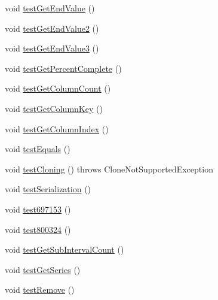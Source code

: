 \begin{DoxyCompactItemize}
void \mbox{\hyperlink{classorg_1_1jfree_1_1data_1_1gantt_1_1_task_series_collection_test_a01d561eb7a8a40abb19d4590eebda12e}{test\+Get\+End\+Value}} ()
\item 
void \mbox{\hyperlink{classorg_1_1jfree_1_1data_1_1gantt_1_1_task_series_collection_test_abdb50e6eccbf3965468acae3431eda00}{test\+Get\+End\+Value2}} ()
\item 
void \mbox{\hyperlink{classorg_1_1jfree_1_1data_1_1gantt_1_1_task_series_collection_test_a1352b5a7e56bd8aa106f960e5f23afeb}{test\+Get\+End\+Value3}} ()
\item 
void \mbox{\hyperlink{classorg_1_1jfree_1_1data_1_1gantt_1_1_task_series_collection_test_a6be0bce25b3c0331ebc6fadff7fbaed9}{test\+Get\+Percent\+Complete}} ()
\item 
void \mbox{\hyperlink{classorg_1_1jfree_1_1data_1_1gantt_1_1_task_series_collection_test_ad8b1835c0fc6e96a371275ae60d9b7be}{test\+Get\+Column\+Count}} ()
\item 
void \mbox{\hyperlink{classorg_1_1jfree_1_1data_1_1gantt_1_1_task_series_collection_test_a4e1fbbdeae868d4a8b20175efdd86a35}{test\+Get\+Column\+Key}} ()
\item 
void \mbox{\hyperlink{classorg_1_1jfree_1_1data_1_1gantt_1_1_task_series_collection_test_afa575992ee65e258f946ef72916b9bcd}{test\+Get\+Column\+Index}} ()
\item 
void \mbox{\hyperlink{classorg_1_1jfree_1_1data_1_1gantt_1_1_task_series_collection_test_adc03e27bbd273f31326b7d4a3b68d0db}{test\+Equals}} ()
\item 
void \mbox{\hyperlink{classorg_1_1jfree_1_1data_1_1gantt_1_1_task_series_collection_test_aafd84de25538bc96eb104ba5385b83a0}{test\+Cloning}} ()  throws Clone\+Not\+Supported\+Exception 
\item 
void \mbox{\hyperlink{classorg_1_1jfree_1_1data_1_1gantt_1_1_task_series_collection_test_ab56b2ba40bf9a5ae740208d1c5639a74}{test\+Serialization}} ()
\item 
void \mbox{\hyperlink{classorg_1_1jfree_1_1data_1_1gantt_1_1_task_series_collection_test_a73f3a71d4db1e6b141debe68c2f035f9}{test697153}} ()
\item 
void \mbox{\hyperlink{classorg_1_1jfree_1_1data_1_1gantt_1_1_task_series_collection_test_af8cfbc63fe59afd204f72b7463cd8c7c}{test800324}} ()
\item 
void \mbox{\hyperlink{classorg_1_1jfree_1_1data_1_1gantt_1_1_task_series_collection_test_a7ccd3ebb36a688121cdc24d702b47499}{test\+Get\+Sub\+Interval\+Count}} ()
\item 
void \mbox{\hyperlink{classorg_1_1jfree_1_1data_1_1gantt_1_1_task_series_collection_test_ab8b75983ca5589b90483aeca5dac802a}{test\+Get\+Series}} ()
\item 
void \mbox{\hyperlink{classorg_1_1jfree_1_1data_1_1gantt_1_1_task_series_collection_test_a8b0070388c89bb79fc33dafe866025ce}{test\+Remove}} ()
\end{DoxyCompactItemize}


